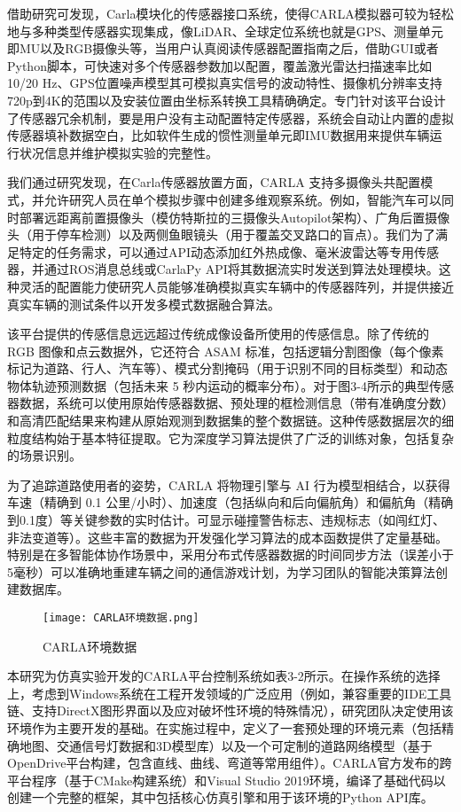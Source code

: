 借助研究可发现，Carla模块化的传感器接口系统，使得CARLA模拟器可较为轻松地与多种类型传感器实现集成，像LiDAR、全球定位系统也就是GPS、测量单元即MU以及RGB摄像头等，当用户认真阅读传感器配置指南之后，借助GUI或者Python脚本，可快速对多个传感器参数加以配置，覆盖激光雷达扫描速率比如10/20 Hz、GPS位置噪声模型其可模拟真实信号的波动特性、摄像机分辨率支持720p到4K的范围以及安装位置由坐标系转换工具精确确定。专门针对该平台设计了传感器冗余机制，要是用户没有主动配置特定传感器，系统会自动让内置的虚拟传感器填补数据空白，比如软件生成的惯性测量单元即IMU数据用来提供车辆运行状况信息并维护模拟实验的完整性。

我们通过研究发现，在Carla传感器放置方面，CARLA 支持多摄像头共配置模式，并允许研究人员在单个模拟步骤中创建多维观察系统。例如，智能汽车可以同时部署远距离前置摄像头（模仿特斯拉的三摄像头Autopilot架构）、广角后置摄像头（用于停车检测）以及两侧鱼眼镜头（用于覆盖交叉路口的盲点）。我们为了满足特定的任务需求，可以通过API动态添加红外热成像、毫米波雷达等专用传感器，并通过ROS消息总线或CarlaPy API将其数据流实时发送到算法处理模块。这种灵活的配置能力使研究人员能够准确模拟真实车辆中的传感器阵列，并提供接近真实车辆的测试条件以开发多模式数据融合算法。

该平台提供的传感信息远远超过传统成像设备所使用的传感信息。除了传统的 RGB 图像和点云数据外，它还符合 ASAM 标准，包括逻辑分割图像（每个像素标记为道路、行人、汽车等）、模式分割掩码（用于识别不同的目标类型）和动态物体轨迹预测数据（包括未来 5 秒内运动的概率分布）。对于图3-4所示的典型传感器数据，系统可以使用原始传感器数据、预处理的框检测信息（带有准确度分数）和高清匹配结果来构建从原始观测到数据集的整个数据链。这种传感数据层次的细粒度结构始于基本特征提取。它为深度学习算法提供了广泛的训练对象，包括复杂的场景识别。

为了追踪道路使用者的姿势，CARLA 将物理引擎与 AI 行为模型相结合，以获得车速（精确到 0.1 公里/小时）、加速度（包括纵向和后向偏航角）和偏航角（精确到0.1度）等关键参数的实时估计。可显示碰撞警告标志、违规标志（如闯红灯、非法变道等）。这些丰富的数据为开发强化学习算法的成本函数提供了定量基础。特别是在多智能体协作场景中，采用分布式传感器数据的时间同步方法（误差小于5毫秒）可以准确地重建车辆之间的通信游戏计划，为学习团队的智能决策算法创建数据库。

\begin{figure}[hbt]
	\centering
	\texttt{[image: CARLA环境数据.png]}
	\caption{CARLA环境数据}
	\label{f.example}
\end{figure}

本研究为仿真实验开发的CARLA平台控制系统如表3-2所示。在操作系统的选择上，考虑到Windows系统在工程开发领域的广泛应用（例如，兼容重要的IDE工具链、支持DirectX图形界面以及应对破坏性环境的特殊情况），研究团队决定使用该环境作为主要开发的基础。在实施过程中，定义了一套预处理的环境元素（包括精确地图、交通信号灯数据和3D模型库）以及一个可定制的道路网络模型（基于OpenDrive平台构建，包含直线、曲线、弯道等常用组件）。CARLA官方发布的跨平台程序（基于CMake构建系统）和Visual Studio 2019环境，编译了基础代码以创建一个完整的框架，其中包括核心仿真引擎和用于该环境的Python API库。

